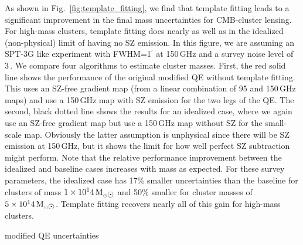 {%

As shown in Fig.~\ref{fig:template_fitting}, we find that template fitting leads to a significant improvement in the final mass uncertainties for CMB-cluster lensing. 
For high-mass clusters, template fitting does nearly as well as in the idealized (non-physical) limit of having no SZ emission. 
In this figure, we are assuming an SPT-3G like experiment with FWHM=1$^\prime$ at 150\,GHz and a survey noise level of 3\,\ukarcmin{}. 
We compare four algorithms to estimate cluster masses.  
First, the red solid line shows the performance of the original modified QE without template fitting. 
This uses  an SZ-free gradient map 
(from a linear combination of 95 and 150\,GHz maps) and use a 150\,GHz map with SZ emission for the two legs of the QE. 
The second, black dotted line shows the results for an idealized case, where we again use an SZ-free gradient map but use a 150\,GHz map without SZ for the small-scale map. 
Obviously the latter assumption is unphysical since there will be SZ emission at 150\,GHz, but it shows the limit for how well perfect SZ subtraction might perform. 
Note that the relative performance improvement between the idealized and baseline cases increases with mass as expected. 
For these survey parameters, the idealized case has 17\% smaller uncertainties than the baseline for clusters of mass $1\times 10^14\,\msolar$ and 50\% smaller for cluster masses of $5\times 10^14\,\msolar$. 
Template fitting recovers nearly all of this gain for high-mass clusters. 


modified QE uncertainties 


}
